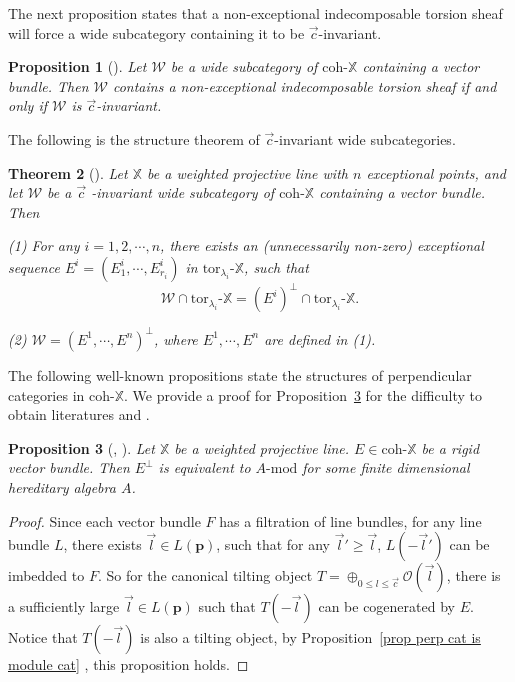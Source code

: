 \documentclass[a4paper, 11pt, reqno]{amsart}
\numberwithin{equation}{section}
\newtheorem{thm}{Theorem}[section]
\newtheorem{prop}[thm]{Proposition}
\theoremstyle{remark}
\theoremstyle{definition}
\begin{document}
The next proposition states that a non-exceptional indecomposable torsion sheaf will force a wide subcategory containing it to be $\vec c$-invariant.

\begin{prop} [{\cite[Proposition 6.2]{cheng2024wide}}] \label{contain_non_exc}
Let $\mathcal W$ be a wide subcategory of $\mathrm{coh} \text{-} \mathbb X$ containing a vector bundle. Then $\mathcal W$ contains a non-exceptional indecomposable torsion sheaf if and only if $\mathcal W$ is $\vec c$-invariant.
\end{prop}

The following is the structure theorem of $\vec c$-invariant wide subcategories.

\begin{thm} [{\cite[Theorem 6.3]{cheng2024wide}}]\label{c_inv}
   Let $\mathbb X$ be a weighted projective line with $n$ exceptional points, and let $\mathcal W$ be a $\vec c$ -invariant wide subcategory of $\mathrm{coh} \text{-} \mathbb X$ containing a vector bundle. Then
   
   (1) For any $i=1,2,\cdots, n$, there exists an (unnecessarily non-zero) exceptional sequence $E^i=(E_1^i,\cdots,E_{r_i}^i)$ in $\mathrm{tor}_{\lambda_i} \text{-} \mathbb X$, such that
   \[
      \mathcal W \cap \mathrm{tor}_{\lambda_i} \text{-} \mathbb X =(E^i)^{\perp} \cap \mathrm{tor}_{\lambda_i} \text{-} \mathbb X.
   \]
   
   (2) $\mathcal W=(E^1,\cdots,E^n)^{\perp}$, where $E^1, \cdots , E^n$ are defined in (1).
\end{thm}

The following well-known propositions state the structures of perpendicular categories in $\mathrm{coh} \text{-} \mathbb X$. We provide a proof for Proposition~\ref{prop bundle perpendicular} for the difficulty to obtain literatures \cite{huebner1993categories} and \cite{huebner1996thesis}.


\begin{prop} [{\cite{huebner1993categories}, \cite[Theorem~5.4]{huebner1996thesis}}] \label{prop bundle perpendicular}
   Let $\mathbb X$ be a weighted projective line. $E \in \mathrm{coh} \text{-} \mathbb X$ be a rigid vector bundle. Then $E^{\perp}$ is equivalent to $A \text{-} \mathrm{mod}$ for some finite dimensional hereditary algebra $A$.
\end{prop}

\begin{proof}
   Since each vector bundle $F$ has a filtration of line bundles, for any line bundle $L$, there exists $\vec l \in L(\bm p)$, such that for any $\vec l' \geq \vec l$, $L(- \vec l')$ can be imbedded to $F$. So for the canonical tilting object $T=\oplus_{0 \leq l \leq \vec c} \mathcal O(\vec l)$, there is a sufficiently large $\vec l \in L(\bm p)$ such that $T(- \vec l)$ can be cogenerated by $E$. Notice that $T(- \vec l)$ is also a tilting object, by Proposition~\ref{prop perp cat is module cat} , this proposition holds.
\end{proof}
\end{document}
